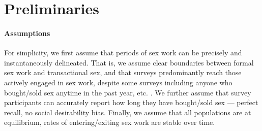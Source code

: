 \section{Preliminaries}\label{pre}
\paragraph{Assumptions}
For simplicity, we first assume that periods of sex work
can be precisely and instantaneously delineated.
That is, we assume clear boundaries between formal sex work and transactional sex,
and that surveys predominantly reach those actively engaged in sex work,
despite some surveys including anyone who
bought/sold sex anytime in the past year, etc. \cite{Scorgie2012}.
We further assume that survey participants
can accurately report how long they have bought/sold sex
--- \ie perfect recall, no social desirability bias.
Finally, we assume that all populations are at equilibrium,
\eg rates of entering/exiting sex work are stable over time.
